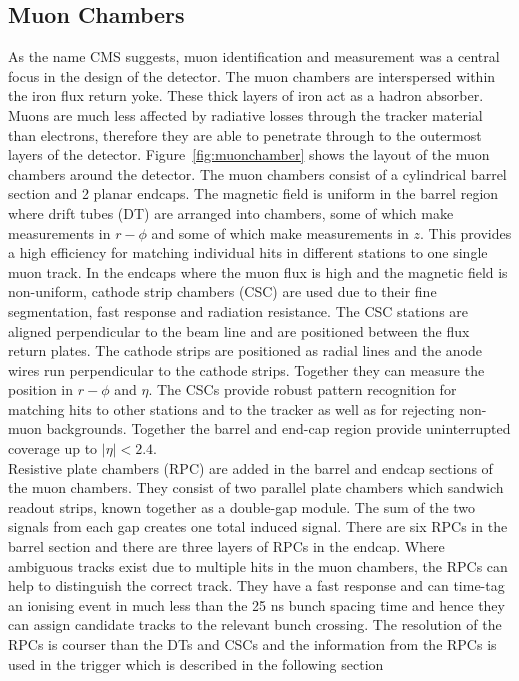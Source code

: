 \subsection{Muon Chambers}

As the name CMS suggests, muon identification and measurement was a central focus in the design of the detector. The muon chambers are interspersed within the iron flux return yoke. These thick layers of iron act as a hadron absorber. Muons are much less affected by radiative losses through the tracker material than electrons, therefore they are able to penetrate through to the outermost layers of the detector. Figure~\ref{fig:muonchamber} shows the layout of the muon chambers around the detector. The muon chambers consist of a cylindrical barrel section and 2 planar endcaps. The magnetic field is uniform in the barrel region where drift tubes (DT) are arranged into chambers, some of which make measurements in $r-\phi$ and some of which make measurements in $z$. This provides a high efficiency for matching individual hits in different stations to one single muon track.
In the endcaps where the muon flux is high and the magnetic field is non-uniform, cathode strip chambers (CSC) are used due to their fine segmentation, fast response and radiation resistance. The CSC stations are aligned perpendicular to the beam line and are positioned between the flux return plates. The cathode strips are positioned as radial lines and the anode wires run perpendicular to the cathode strips. Together they can measure the position in $r-\phi$ and $\eta$. The CSCs provide robust pattern recognition for matching hits to other stations and to the tracker as well as for rejecting non-muon backgrounds. 
Together the barrel and end-cap region provide uninterrupted coverage up to $|\eta|<2.4$.\\
Resistive plate chambers (RPC) are added in the barrel and endcap sections of the muon chambers. They consist of two parallel plate chambers which sandwich readout strips, known together as a double-gap module. The sum of the two signals from each gap creates one total induced signal. There are six RPCs in the barrel section and there are three layers of RPCs in the endcap.
Where ambiguous tracks exist due to multiple hits in the muon chambers, the RPCs can help to distinguish the correct track. They have a fast response and can time-tag an ionising event in much less than the 25 ns bunch spacing time and hence they can assign candidate tracks to the relevant bunch crossing. The resolution of the RPCs is courser than the DTs and CSCs and the information from the RPCs is used in the trigger which is described in the following section

